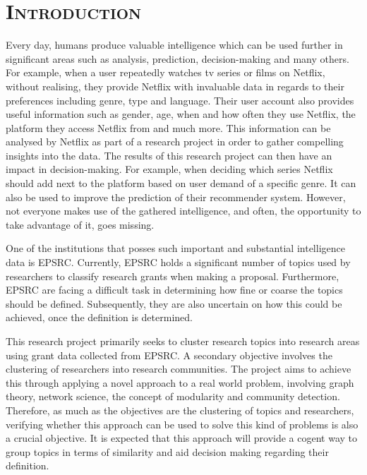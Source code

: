 \chapter{\textsc{Introduction}}
\label{chapterlabel1}

Every day, humans produce valuable intelligence which can be used further in significant areas such as analysis, prediction, decision-making and many others. For example, when a user repeatedly watches tv series or films on Netflix, without realising, they provide Netflix with invaluable data in regards to their preferences including genre, type and language. Their user account also provides useful information such as gender, age, when and how often they use Netflix, the platform they access Netflix from and much more. This information can be analysed by Netflix as part of a research project in order to gather compelling insights into the data. The results of this research project can then have an impact in decision-making. For example, when deciding which series Netflix should add next to the platform based on user demand of a specific genre. It can also be used to improve the prediction of their recommender system. However, not everyone makes use of the gathered intelligence, and often, the opportunity to take advantage of it, goes missing.

One of the institutions that posses such important and substantial intelligence data is EPSRC. Currently, EPSRC holds a significant number of topics used by researchers to classify research grants when making a proposal. Furthermore, EPSRC are facing a difficult task in determining how fine or coarse the topics should be defined. Subsequently, they are also uncertain on how this could be achieved, once the definition is determined.

This research project primarily seeks to cluster research topics into research areas using grant data collected from EPSRC. A secondary objective involves the clustering of researchers into research communities. The project aims to achieve this through applying a novel approach to a real world problem, involving graph theory, network science, the concept of modularity and community detection. Therefore, as much as the objectives are the clustering of topics and researchers, verifying whether this approach can be used to solve this kind of problems is also a crucial objective. It is expected that this approach will provide a cogent way to group topics in terms of similarity and aid decision making regarding their definition.

